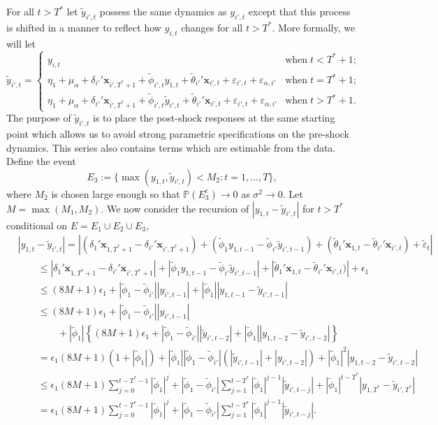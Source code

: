 \documentclass[11pt]{article}
\newcommand{\x}{\textbf{x}}
\newcommand{\Prob}{\mathbb{P}}
\theoremstyle{definition}
\begin{document}
For all $t > T^*$ let $\tilde y_{i',t}$ possess the same dynamics as $y_{i',t}$ except that this process is shifted in a manner to reflect how $y_{i,t}$ changes for all $t > T^*$. More formally, we will let 
$$
  \tilde y_{i',t} = \left\{\begin{array}{cc}
  y_{i,t} & \text{when} \; t < T^*+1; \\ 
  \eta_1 + \mu_\alpha + \delta_{i'}' \x_{i',T^*+1} + \tilde\phi_{i',t}y_{1,t} + \tilde\theta_{i'}'\x_{i',t} + \varepsilon_{i',t} + \varepsilon_{\alpha,i'} & \text{when} \; t = T^* + 1; \\
  \eta_1 + \mu_\alpha + \delta_{i'}' \x_{i',T^*+1} + \tilde\phi_{i',t}\tilde y_{i',t} + \tilde\theta_{i'}'\x_{i',t} + \varepsilon_{i',t} + \varepsilon_{\alpha,i'} & \text{when} \; t > T^* + 1.
\end{array}\right.	
$$
The purpose of $\tilde y_{i',t}$ is to place the post-shock responses at the same starting point which allows us to avoid strong parametric specifications on the pre-shock dynamics. This series also contains terms which are estimable from the data. Define the event 
$$
  E_3 := \{\max\left(y_{1,t},\tilde y_{i',t}\right) < M_2 : t = 1,\ldots,T\}, 
$$
where $M_2$ is chosen large enough so that $\Prob(E_3^c) \to 0$ as $\sigma^2 \to 0$. Let $M = \max(M_1,M_2).$ We now consider the recursion of $|y_{1,t} - \tilde{y}_{i',t}|$ for $t > T^*$ conditional on $E = E_1 \cup E_2 \cup E_3$, 
\begin{align*}
	&|y_{1,t} - \tilde{y}_{i',t}| 
		= |(\delta_1'\x_{1,T^*+1} - \delta_{i'}'\x_{i',T^*+1})
		+ (\tilde\phi_{1}y_{1,t-1} - \tilde\phi_{i'}\tilde{y}_{i',t-1}) 
		+ (\tilde\theta_{1}'\x_{1,t} - \tilde\theta_{i'}'\x_{i',t}) + \tilde\varepsilon_t| \\
	&\qquad \leq |\delta_1'\x_{1,T^*+1} - \delta_{i'}'\x_{i',T^*+1}|
		+ |\tilde\phi_{1}y_{1,t-1} - \tilde\phi_{i'}\tilde{y}_{i',t-1}| 
		+ |\tilde\theta_{1}'\x_{1,t} - \tilde\theta_{i'}'\x_{i',t})| 
		+ \epsilon_1 \\
	&\qquad\leq (8M + 1)\epsilon_1 + |\tilde\phi_{1} - \tilde\phi_{i'}||y_{i',t-1}| + |\tilde\phi_1||y_{1,t-1} - \tilde{y}_{i',t-1}| \\
	&\qquad\leq (8M + 1)\epsilon_1 + |\tilde\phi_{1} - \tilde\phi_{i'}||y_{i',t-1}| \\ 
	&\qquad\qquad+ |\tilde\phi_1|\left\{(8M + 1)\epsilon_1 + |\tilde\phi_{1} - \tilde\phi_{i'}||\tilde{y}_{i',t-2}| + |\tilde\phi_1||y_{1,t-2} - \tilde{y}_{i',t-2}|\right\} \\
	&\qquad= \epsilon_1(8M + 1)(1 + |\tilde\phi_1|) + |\tilde\phi_1||\tilde\phi_{1} - \tilde\phi_{i'}|(|\tilde{y}_{i',t-1}| + |y_{i',t-2}|) + |\tilde\phi_1|^2|y_{1,t-2} - \tilde{y}_{i',t-2}| \\
	&\qquad \leq \epsilon_1(8M + 1)\sum_{j=0}^{t-T^*-1}|\tilde\phi_1|^j + |\tilde\phi_{1} - \tilde\phi_{i'}|\sum_{j=1}^{t-T^*}|\tilde\phi_1|^{j-1}|\tilde{y}_{i',t-j}| + |\tilde\phi_1|^{t-T^*}|y_{1,T^*} - \tilde{y}_{i',T^*}| \\
	&\qquad = \epsilon_1(8M + 1)\sum_{j=0}^{t-T^*-1}|\tilde\phi_1|^j + |\tilde\phi_{1} - \tilde\phi_{i'}|\sum_{j=1}^{t-T^*}|\tilde\phi_1|^{j-1}|\tilde{y}_{i',t-j}|.
\end{align*}
\end{document}
